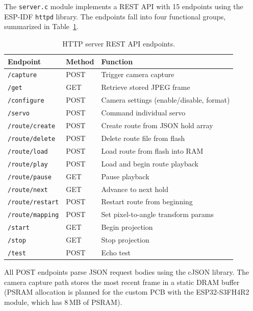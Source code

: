 \documentclass[12pt]{article}
\begin{document}
The \texttt{server.c} module implements a REST API with 15 endpoints using
the ESP-IDF \texttt{httpd} library.  The endpoints fall into four functional
groups, summarized in Table~\ref{tab:endpoints}.

\begin{table}[H]
  \centering
  \caption{HTTP server REST API endpoints.}
  \label{tab:endpoints}
  \begin{tabular}{lll}
    \toprule
    Endpoint & Method & Function \\
    \midrule
    \texttt{/capture}        & POST & Trigger camera capture \\
    \texttt{/get}            & GET  & Retrieve stored JPEG frame \\
    \texttt{/configure}      & POST & Camera settings (enable/disable, format) \\
    \texttt{/servo}          & POST & Command individual servo \\
    \texttt{/route/create}   & POST & Create route from JSON hold array \\
    \texttt{/route/delete}   & POST & Delete route file from flash \\
    \texttt{/route/load}     & POST & Load route from flash into RAM \\
    \texttt{/route/play}     & POST & Load and begin route playback \\
    \texttt{/route/pause}    & GET  & Pause playback \\
    \texttt{/route/next}     & GET  & Advance to next hold \\
    \texttt{/route/restart}  & POST & Restart route from beginning \\
    \texttt{/route/mapping}  & POST & Set pixel-to-angle transform params \\
    \texttt{/start}          & GET  & Begin projection \\
    \texttt{/stop}           & GET  & Stop projection \\
    \texttt{/test}           & POST & Echo test \\
    \bottomrule
  \end{tabular}
\end{table}

All POST endpoints parse JSON request bodies using the cJSON library.
The camera capture path stores the most recent frame in a static DRAM buffer
(PSRAM allocation is planned for the custom PCB with the ESP32-S3FH4R2
module, which has 8\,MB of PSRAM).
\end{document}
